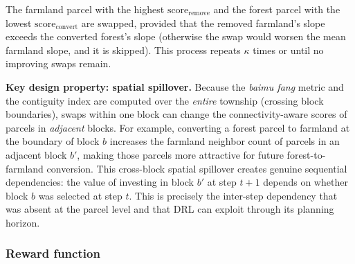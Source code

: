 \documentclass[preprint,12pt]{elsarticle}
\begin{document}
The farmland parcel with the highest $\text{score}_{\text{remove}}$ and the forest parcel with the lowest $\text{score}_{\text{convert}}$ are swapped, provided that the removed farmland's slope exceeds the converted forest's slope (otherwise the swap would worsen the mean farmland slope, and it is skipped). This process repeats $\kappa$ times or until no improving swaps remain.

\textbf{Key design property: spatial spillover.} Because the \textit{baimu fang} metric and the contiguity index are computed over the \textit{entire} township (crossing block boundaries), swaps within one block can change the connectivity-aware scores of parcels in \textit{adjacent} blocks. For example, converting a forest parcel to farmland at the boundary of block $b$ increases the farmland neighbor count of parcels in an adjacent block $b'$, making those parcels more attractive for future forest-to-farmland conversion. This cross-block spatial spillover creates genuine sequential dependencies: the value of investing in block $b'$ at step $t+1$ depends on whether block $b$ was selected at step $t$. This is precisely the inter-step dependency that was absent at the parcel level and that DRL can exploit through its planning horizon.

\subsubsection{Reward function}
\end{document}
